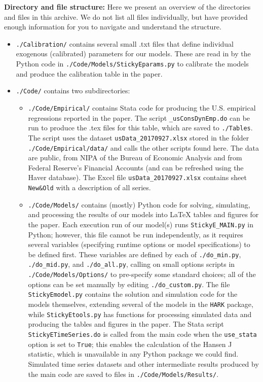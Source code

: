 \documentclass[12pt,pdftex,letterpaper]{article}
\begin{document}
\noindent \textbf{Directory and file structure:} Here we present an overview of the directories and files in this archive.  We do not list all files individually, but have provided enough information for you to navigate and understand the structure.
\begin{itemize}

\item \texttt{./Calibration/} contains several small .txt files that define individual exogenous (calibrated) parameters for our models.  These are read in by the Python code in \texttt{./Code/Models/StickyEparams.py} to calibrate the models and produce the calibration table in the paper.

\item \texttt{./Code/} contains two subdirectories:

\begin{itemize}

\item \texttt{./Code/Empirical/} contains Stata code for producing the U.S. empirical regressions reported in the paper.  The script \texttt{\_usConsDynEmp.do} can be run to produce the .tex files for this table, which are saved to \texttt{./Tables}.  The script uses the dataset \texttt{usData\_20170927.xlsx} stored in the folder \texttt{./Code/Empirical/data/} and calls the other scripts found here.  The data are public, from NIPA of the Bureau of Economic Analysis and from Federal Reserve's Financial Accounts (and can be refreshed using the Haver database). The Excel file \texttt{usData\_20170927.xlsx} contains sheet \texttt{New\&Old} with a description of all series.

\item \texttt{./Code/Models/} contains (mostly) Python code for solving, simulating, and processing the results of our models into LaTeX tables and figures for the paper.  Each execution run of our model(s) runs \texttt{StickyE\_MAIN.py} in Python; however, this file cannot be run independently, as it requires several variables (specifying runtime options or model specifications) to be defined first.  These variables are defined by each of \texttt{./do\_min.py}, \texttt{./do\_mid.py}, and \texttt{./do\_all.py}, calling on small options scripts in \texttt{./Code/Models/Options/} to pre-specify some standard choices; all of the options can be set manually by editing \texttt{./do\_custom.py}.  The file \texttt{StickyEmodel.py} contains the solution and simulation code for the models themselves, extending several of the models in the \texttt{HARK} package, while \texttt{StickyEtools.py} has functions for processing simulated data and producing the tables and figures in the paper.  The Stata script \texttt{StickyETimeSeries.do} is called from the main code when the \texttt{use\_stata} option is set to \texttt{True}; this enables the calculation of the Hansen J statistic, which is unavailable in any Python package we could find.  Simulated time series datasets and other intermediate results produced by the main code are saved to files in \texttt{./Code/Models/Results/}.


\end{itemize}
\end{itemize}
\end{document}
